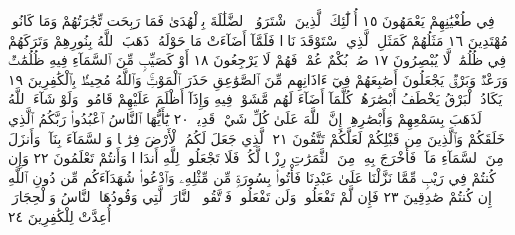 \documentclass{article}
\begin{document}
فِي طُغْيَٰنِهِمْ يَعْمَهُونَ ١٥ أُو۟لَٰٓئِكَ ٱلَّذِينَ ٱشْتَرَوُا۟ ٱلضَّلَٰلَةَ
بِٱلْهُدَىٰ فَمَا رَبِحَت تِّجَٰرَتُهُمْ وَمَا كَانُوا۟ مُهْتَدِينَ ١٦
مَثَلُهُمْ كَمَثَلِ ٱلَّذِي ٱسْتَوْقَدَ نَارࣰا فَلَمَّآ أَضَآءَتْ مَا حَوْلَهُۥ
ذَهَبَ ٱللَّهُ بِنُورِهِمْ وَتَرَكَهُمْ فِي ظُلُمَٰتࣲ لَّا يُبْصِرُونَ ١٧ صُمُّۢ
بُكْمٌ عُمْيࣱ فَهُمْ لَا يَرْجِعُونَ ١٨ أَوْ كَصَيِّبࣲ مِّنَ ٱلسَّمَآءِ فِيهِ
ظُلُمَٰتࣱ وَرَعْدࣱ وَبَرْقࣱ يَجْعَلُونَ أَصَٰبِعَهُمْ فِيٓ ءَاذَانِهِم مِّنَ
ٱلصَّوَٰعِقِ حَذَرَ ٱلْمَوْتِۚ وَٱللَّهُ مُحِيطُۢ بِٱلْكَٰفِرِينَ ١٩ يَكَادُ ٱلْبَرْقُ
يَخْطَفُ أَبْصَٰرَهُمْۖ كُلَّمَآ أَضَآءَ لَهُم مَّشَوْا۟ فِيهِ وَإِذَآ أَظْلَمَ عَلَيْهِمْ
قَامُوا۟ۚ وَلَوْ شَآءَ ٱللَّهُ لَذَهَبَ بِسَمْعِهِمْ وَأَبْصَٰرِهِمْۚ إِنَّ ٱللَّهَ عَلَىٰ
كُلِّ شَيْءࣲ قَدِيرࣱ ٢٠ يَٰٓأَيُّهَا ٱلنَّاسُ ٱعْبُدُوا۟ رَبَّكُمُ ٱلَّذِي
خَلَقَكُمْ وَٱلَّذِينَ مِن قَبْلِكُمْ لَعَلَّكُمْ تَتَّقُونَ ٢١ ٱلَّذِي جَعَلَ لَكُمُ
ٱلْأَرْضَ فِرَٰشࣰا وَٱلسَّمَآءَ بِنَآءࣰ وَأَنزَلَ مِنَ ٱلسَّمَآءِ مَآءࣰ فَأَخْرَجَ
بِهِۦ مِنَ ٱلثَّمَرَٰتِ رِزْقࣰا لَّكُمْۖ فَلَا تَجْعَلُوا۟ لِلَّهِ أَندَادࣰا وَأَنتُمْ
تَعْلَمُونَ ٢٢ وَإِن كُنتُمْ فِي رَيْبࣲ مِّمَّا نَزَّلْنَا عَلَىٰ عَبْدِنَا فَأْتُوا۟
بِسُورَةࣲ مِّن مِّثْلِهِۦ وَٱدْعُوا۟ شُهَدَآءَكُم مِّن دُونِ ٱللَّهِ إِن
كُنتُمْ صَٰدِقِينَ ٢٣ فَإِن لَّمْ تَفْعَلُوا۟ وَلَن تَفْعَلُوا۟ فَٱتَّقُوا۟ ٱلنَّارَ
ٱلَّتِي وَقُودُهَا ٱلنَّاسُ وَٱلْحِجَارَةُۖ أُعِدَّتْ لِلْكَٰفِرِينَ ٢٤
\end{document}
